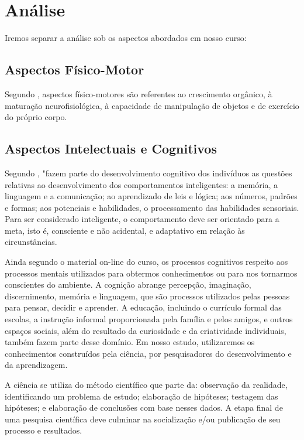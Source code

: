 \section{Análise}

Iremos separar a análise sob os aspectos abordados em nosso curso:

\subsection{Aspectos Físico-Motor}

Segundo , aspectos físico-motores são referentes ao crescimento orgânico, à maturação neurofisiológica, à capacidade de manipulação de objetos e de exercício do próprio corpo.

\subsection{Aspectos Intelectuais e Cognitivos}

Segundo , "fazem parte do desenvolvimento cognitivo dos indivíduos as questões relativas ao desenvolvimento dos comportamentos inteligentes: a memória, a linguagem e a comunicação; ao aprendizado de leis e lógica; aos números, padrões e formas; aos potenciais e habilidades, o processamento das habilidades sensoriais. Para ser considerado inteligente, o comportamento deve ser orientado para a meta, isto é, consciente e não acidental, e adaptativo em relação às circunstâncias.

Ainda segundo o material on-line do curso, os processos cognitivos respeito aos processos mentais utilizados para obtermos conhecimentos ou para nos tornarmos conscientes do ambiente. A cognição abrange percepção, imaginação, discernimento, memória e linguagem, que são processos utilizados pelas pessoas para pensar, decidir e aprender.  A educação, incluindo o currículo formal das escolas, a instrução informal proporcionada pela família e pelos amigos, e outros espaços sociais, além do resultado da curiosidade e da criatividade individuais, também fazem parte desse domínio.
Em nosso estudo, utilizaremos os conhecimentos construídos pela ciência, por pesquisadores do desenvolvimento e da aprendizagem.

A ciência se utiliza do método científico que parte da: observação da realidade, identificando um problema de estudo; elaboração de hipóteses; testagem das hipóteses; e elaboração de conclusões com base nesses dados. A etapa final de uma pesquisa científica deve culminar na socialização e/ou publicação de seu processo e resultados.




